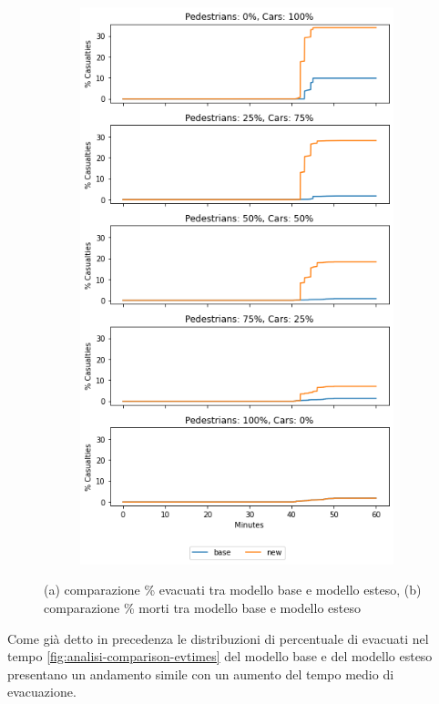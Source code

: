 \begin{figure}
\begin{subfigure}{0.475\textwidth}
        \includegraphics[width=\textwidth]{images/analisi/comparison-total-casualties.png}
    \end{subfigure}
    \caption{(a) comparazione \% evacuati tra modello base e modello esteso, (b) comparazione \% morti tra modello base e modello esteso}
    \label{fig:analisi-comparison-total-ec}
\end{figure}

Come già detto in precedenza le distribuzioni di percentuale di evacuati nel tempo \ref*{fig:analisi-comparison-evtimes} del modello base e del modello esteso 
presentano un andamento simile con un aumento del tempo medio di evacuazione.

